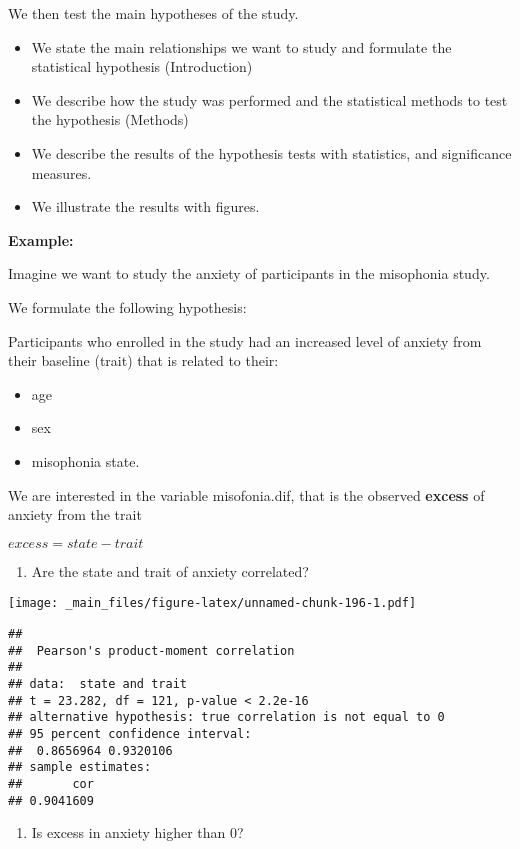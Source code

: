 \documentclass[
]{book}
\providecommand{\tightlist}{%
  \setlength{\itemsep}{0pt}\setlength{\parskip}{0pt}}
\begin{document}
We then test the main hypotheses of the study.

\begin{itemize}
\item
  We state the main relationships we want to study and formulate the statistical hypothesis (Introduction)
\item
  We describe how the study was performed and the statistical methods to test the hypothesis (Methods)
\item
  We describe the results of the hypothesis tests with statistics, and significance measures.
\item
  We illustrate the results with figures.
\end{itemize}

\textbf{Example:}

Imagine we want to study the anxiety of participants in the misophonia study.

We formulate the following hypothesis:

Participants who enrolled in the study had an increased level of anxiety from their baseline (trait) that is related to their:

\begin{itemize}
\tightlist
\item
  age
\item
  sex
\item
  misophonia state.
\end{itemize}

We are interested in the variable misofonia.dif, that is the observed \textbf{excess} of anxiety from the trait

\(excess = state - trait\)

\begin{enumerate}
\def\labelenumi{\arabic{enumi}.}
\tightlist
\item
  Are the state and trait of anxiety correlated?
\end{enumerate}

\texttt{[image: \_main\_files/figure-latex/unnamed-chunk-196-1.pdf]}

\begin{verbatim}
## 
##  Pearson's product-moment correlation
## 
## data:  state and trait
## t = 23.282, df = 121, p-value < 2.2e-16
## alternative hypothesis: true correlation is not equal to 0
## 95 percent confidence interval:
##  0.8656964 0.9320106
## sample estimates:
##       cor 
## 0.9041609
\end{verbatim}

\begin{enumerate}
\def\labelenumi{\arabic{enumi}.}
\setcounter{enumi}{1}
\tightlist
\item
  Is excess in anxiety higher than \(0\)?
\end{enumerate}
\end{document}
